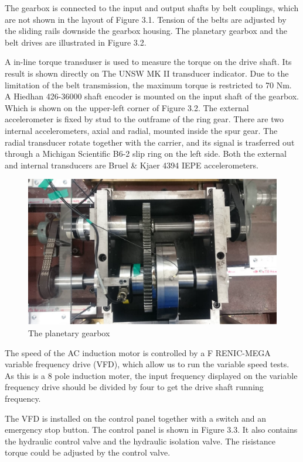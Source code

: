 The gearbox is connected to the input and output shafts by belt couplings, which are not shown in the layout of Figure 3.1. Tension of the belts are adjusted by the sliding rails downside the gearbox housing. The planetary gearbox and the belt drives are illustrated in Figure 3.2.

A in-line torque transduser is used to measure the torque on the drive shaft. Its result is shown directly on The UNSW MK II transducer indicator. Due to the limitation of the belt transmission, the maximum torque is restricted to 70 Nm.
A Hiedhan 426-36000 shaft encoder is mounted on the input shaft of the gearbox. Which is shown on the upper-left corner of Figure 3.2. 
The external accelerometer is fixed by stud to the outframe of the ring gear. There are two internal accelerometers, axial and radial, mounted inside the spur gear. The radial transducer rotate together with the carrier, and its signal is trasferred out through a Michigan Scientific B6-2 slip ring on the left side. Both the external and internal transducers are Bruel \& Kjaer 4394 IEPE accelerometers.

\begin{figure}
	\centering
	\includegraphics{gearbox}
	\caption{The planetary gearbox}
	\label{gearbox}
\end{figure}

The speed of the AC induction motor is controlled by a F		RENIC-MEGA variable frequency drive (VFD), which allow us to run the variable speed tests. As this is a 8 pole induction moter, the input frequency displayed on the variable frequency drive should be divided by four to get the drive shaft running frequency.

The VFD is installed on the control panel together with a switch and an emergency stop button. The control panel is shown in Figure 3.3. It also contains the hydraulic control valve and the hydraulic isolation valve. The risistance torque could be adjusted by the control valve.

